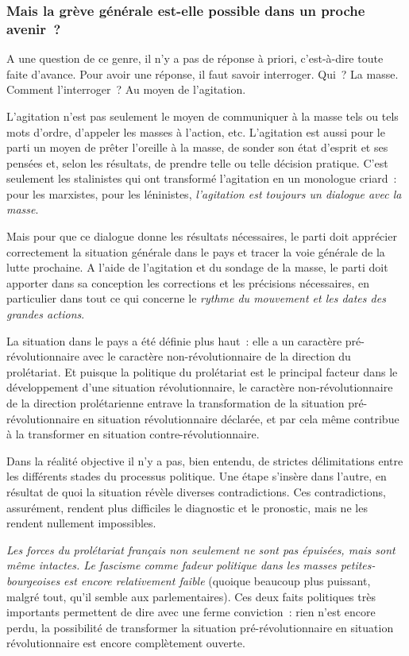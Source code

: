 \documentclass[french,twoside]{book} %
\begin{document}
 \subsubsection[{Mais la grève générale est-elle possible dans un proche avenir ?}]{Mais la grève générale est-elle possible dans un proche avenir ?}
\noindent A une question de ce genre, il n’y a pas de réponse à priori, c’est-à-dire toute faite d’avance. Pour avoir une réponse, il faut savoir interroger. Qui ? La masse. Comment l’interroger ? Au moyen de l’agitation.\par
L’agitation n’est pas seulement le moyen de communiquer à la masse tels ou tels mots d’ordre, d’appeler les masses à l’action, etc. L’agitation est aussi pour le parti un moyen de prêter l’oreille à la masse, de sonder son état d’esprit et ses pensées et, selon les résultats, de prendre telle ou telle décision pratique. C’est seulement les stalinistes qui ont transformé l’agitation en un monologue criard : pour les marxistes, pour les léninistes, \emph{l’agitation est toujours un dialogue avec la masse}.\par
Mais pour que ce dialogue donne les résultats nécessaires, le parti doit apprécier correctement la situation générale dans le pays et tracer la voie générale de la lutte prochaine. A l’aide de l’agitation et du sondage de la masse, le parti doit apporter dans sa conception les corrections et les précisions nécessaires, en particulier dans tout ce qui concerne le \emph{rythme du mouvement et les dates des grandes actions}.\par
La situation dans le pays a été définie plus haut : elle a un caractère pré-révolutionnaire avec le caractère non-révolutionnaire de la direction du prolétariat. Et puisque la politique du prolétariat est le principal facteur dans le développement d’une situation révolutionnaire, le caractère non-révolutionnaire de la direction prolétarienne entrave la transformation de la situation pré-révolutionnaire en situation révolutionnaire déclarée, et par cela même contribue à la transformer en situation contre-révolutionnaire.\par
Dans la réalité objective il n’y a pas, bien entendu, de strictes délimitations entre les différents stades du processus  politique. Une étape s’insère dans l’autre, en résultat de quoi la situation révèle diverses contradictions. Ces contradictions, assurément, rendent plus difficiles le diagnostic et le pronostic, mais ne les rendent nullement impossibles.\par
\emph{Les forces du prolétariat français non seulement ne sont pas épuisées, mais sont même intactes. Le fascisme comme fadeur politique dans les masses petites-bourgeoises est encore relativement faible} (quoique beaucoup plus puissant, malgré tout, qu’il semble aux parlementaires). Ces deux faits politiques très importants permettent de dire avec une ferme conviction : rien n’est encore perdu, la possibilité de transformer la situation pré-révolutionnaire en situation révolutionnaire est encore complètement ouverte.\par
\end{document}
